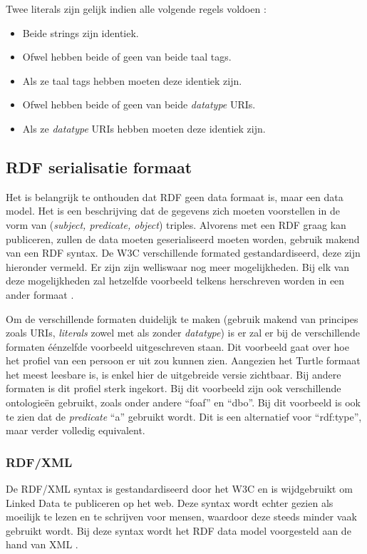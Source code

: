 Twee literals zijn gelijk indien alle volgende regels voldoen \cite{klyne2009resource}:
\begin{itemize}
    \item Beide strings zijn identiek.
    \item Ofwel hebben beide of geen van beide taal tags.
    \item Als ze taal tags hebben moeten deze identiek zijn.
    \item Ofwel hebben beide of geen van beide \textit{datatype} URIs.
    \item Als ze \textit{datatype} URIs hebben moeten deze identiek zijn.
\end{itemize}




\subsection{RDF serialisatie formaat}
\label{subsec:rdf_format}
Het is belangrijk te onthouden dat RDF geen data formaat is, maar een data model. Het is een beschrijving dat de gegevens zich moeten voorstellen in de vorm van (\textit{subject, predicate, object}) triples. Alvorens met een RDF graag kan publiceren, zullen de data moeten geserialiseerd moeten worden, gebruik makend van een RDF syntax. De W3C verschillende formated gestandardiseerd, deze zijn hieronder vermeld. Er zijn zijn welliswaar nog meer mogelijkheden. Bij elk van deze mogelijkheden zal hetzelfde voorbeeld telkens herschreven worden in een ander formaat \cite{heath2011linked}.

Om de verschillende formaten duidelijk te maken (gebruik makend van principes zoals URIs, \textit{literals} zowel met als zonder \textit{datatype}) is er zal er bij de verschillende formaten éénzelfde voorbeeld uitgeschreven staan. Dit voorbeeld gaat over hoe het profiel van een persoon er uit zou kunnen zien. Aangezien het Turtle formaat het meest leesbare is, is enkel hier de uitgebreide versie zichtbaar. Bij andere formaten is dit profiel sterk ingekort. Bij dit voorbeeld zijn ook verschillende ontologieën gebruikt, zoals onder andere ``foaf'' en ``dbo''. Bij dit voorbeeld is ook te zien dat de \textit{predicate} ``a'' gebruikt wordt. Dit is een alternatief voor ``rdf:type'', maar verder volledig equivalent.

\subsubsection{RDF/XML}
De RDF/XML syntax is gestandardiseerd door het W3C en is wijdgebruikt om Linked Data te publiceren op het web. Deze syntax wordt echter gezien als moeilijk te lezen en te schrijven voor mensen, waardoor deze steeds minder vaak gebruikt wordt. Bij deze syntax wordt het RDF data model voorgesteld aan de hand van XML \cite{manola2004rdf}.

